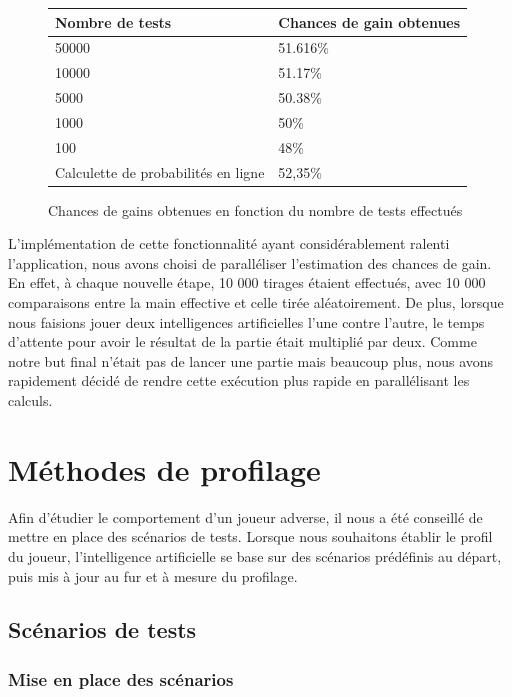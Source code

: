 \documentclass{report}
\begin{document}
\begin{figure}[H]
\begin{center}
\begin{tabular}{|l|l|}
\hline
Nombre de tests & Chances de gain obtenues\\
\hline
50000  & 51.616\%\\
\hline
10000 & 51.17\%\\
\hline
5000 & 50.38\%\\
\hline
1000 & 50\%\\
\hline
100 & 48\%\\
\hline
Calculette de probabilités en ligne & 52,35\%\\
\hline
\end{tabular}
\end{center}
\caption{Chances de gains obtenues en fonction du nombre de tests effectués}
\end{figure}


L'implémentation de cette fonctionnalité ayant considérablement ralenti l'application, nous avons choisi de paralléliser l'estimation des chances de gain. En effet, à chaque nouvelle étape, 10 000 tirages étaient effectués, avec 10 000 comparaisons entre la main effective et celle tirée aléatoirement. De plus, lorsque nous faisions jouer deux intelligences artificielles l'une contre l'autre, le temps d'attente pour avoir le résultat de la partie était multiplié par deux. Comme notre but final n'était pas de lancer une partie mais beaucoup plus, nous avons rapidement décidé de rendre cette exécution plus rapide en parallélisant les calculs.\par

\chapter{Méthodes de profilage}

\hspace{0.5cm}Afin d'étudier le comportement d'un joueur adverse, il nous a été conseillé de mettre en place des scénarios de tests. Lorsque nous souhaitons établir le profil du joueur, l'intelligence artificielle se base sur des scénarios prédéfinis au départ, puis mis à jour au fur et à mesure du profilage.

\section{Scénarios de tests}

\subsection{Mise en place des scénarios}
\end{document}

